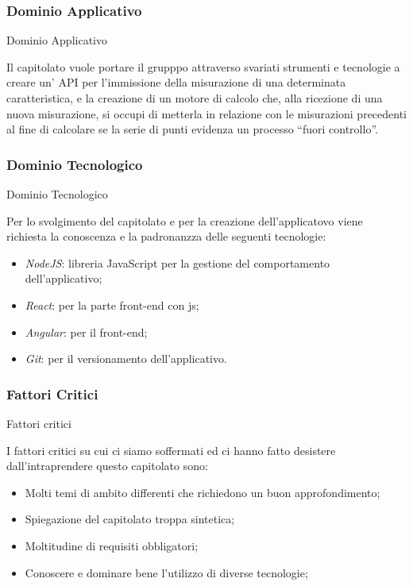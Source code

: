 \documentclass[11pt]{article}
\begin{document}
        \subsubsection{Dominio Applicativo} Dominio Applicativo
        
        Il capitolato vuole portare il grupppo attraverso svariati strumenti e tecnologie a  creare un' API per l’immissione della misurazione di una determinata caratteristica, e la creazione di un motore di calcolo che, alla ricezione di una nuova misurazione, si occupi di metterla in relazione con le
        misurazioni precedenti al fine di calcolare se la serie di punti evidenza un processo “fuori controllo”.
        \subsubsection{Dominio Tecnologico} Dominio Tecnologico
        
        Per lo svolgimento del capitolato e per la creazione dell'applicatovo viene richiesta la conoscenza e la padronanzza delle seguenti tecnologie:
        \begin{itemize}
            \item \textit{NodeJS}: libreria JavaScript per la gestione del comportamento dell'applicativo;
            \item \textit{React}: per la parte front-end con js;
            \item \textit{Angular}: per il front-end;
            \item \textit{Git}: per il versionamento dell'applicativo.
        \end{itemize}
    
    \subsubsection{Fattori Critici} Fattori critici
    
    I fattori critici su cui ci siamo soffermati ed ci hanno fatto desistere dall'intraprendere questo capitolato sono:
    \begin{itemize}
            \item Molti temi di ambito differenti che richiedono un buon approfondimento;
            \item Spiegazione del capitolato troppa sintetica; 
            \item Moltitudine di requisiti obbligatori;
            \item Conoscere e dominare bene l'utilizzo di diverse tecnologie;
        \end{itemize}
\end{document}
